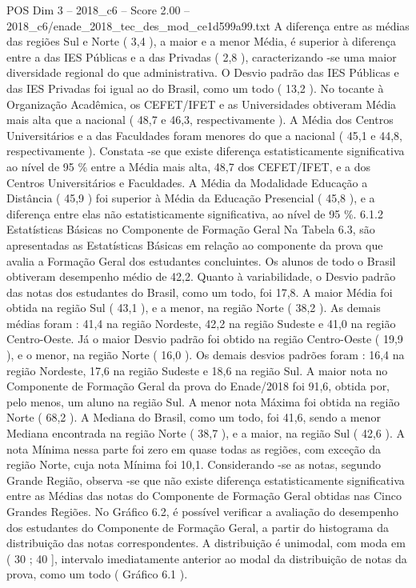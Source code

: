 \begin{textsample}{POS Dim 3 – 2018\_c6 – Score 2.00 – 2018\_c6/enade\_2018\_tec\_des\_mod\_ce1d599a99.txt}
A diferença entre as médias das regiões Sul e Norte ( 3,4 ), a maior e a menor Média, é superior à diferença entre a das IES Públicas e a das Privadas ( 2,8 ), caracterizando -se uma maior diversidade regional do que administrativa.
O Desvio padrão das IES Públicas e das IES Privadas foi igual ao do Brasil, como um todo ( 13,2 ).
No tocante à Organização Acadêmica, os CEFET/IFET e as Universidades obtiveram Média mais alta que a nacional ( 48,7 e 46,3, respectivamente ).
A Média dos Centros Universitários e a das Faculdades foram menores do que a nacional ( 45,1 e 44,8, respectivamente ).
Constata -se que existe diferença estatisticamente significativa ao nível de 95 \% entre a Média mais alta, 48,7 dos CEFET/IFET, e a dos Centros Universitários e Faculdades.
A Média da Modalidade Educação a Distância ( 45,9 ) foi superior à Média da Educação Presencial ( 45,8 ), e a diferença entre elas não estatisticamente significativa, ao nível de 95 \%. 6.1.2 Estatísticas Básicas no Componente de Formação Geral Na Tabela 6.3, são apresentadas as Estatísticas Básicas em relação ao componente da prova que avalia a Formação Geral dos estudantes concluintes.
Os alunos de todo o Brasil obtiveram desempenho médio de 42,2.
Quanto à variabilidade, o Desvio padrão das notas dos estudantes do Brasil, como um todo, foi 17,8.
A maior Média foi obtida na região Sul ( 43,1 ), e a menor, na região Norte ( 38,2 ).
As demais médias foram : 41,4 na região Nordeste, 42,2 na região Sudeste e 41,0 na região Centro-Oeste.
Já o maior Desvio padrão foi obtido na região Centro-Oeste ( 19,9 ), e o menor, na região Norte ( 16,0 ).
Os demais desvios padrões foram : 16,4 na região Nordeste, 17,6 na região Sudeste e 18,6 na região Sul.
A maior nota no Componente de Formação Geral da prova do Enade/2018 foi 91,6, obtida por, pelo menos, um aluno na região Sul.
A menor nota Máxima foi obtida na região Norte ( 68,2 ).
A Mediana do Brasil, como um todo, foi 41,6, sendo a menor Mediana encontrada na região Norte ( 38,7 ), e a maior, na região Sul ( 42,6 ).
A nota Mínima nessa parte foi zero em quase todas as regiões, com exceção da região Norte, cuja nota Mínima foi 10,1.
Considerando -se as notas, segundo Grande Região, observa -se que não existe diferença estatisticamente significativa entre as Médias das notas do Componente de Formação Geral obtidas nas Cinco Grandes Regiões.
No Gráfico 6.2, é possível verificar a avaliação do desempenho dos estudantes do Componente de Formação Geral, a partir do histograma da distribuição das notas correspondentes.
A distribuição é unimodal, com moda em ( 30 ; 40 ], intervalo imediatamente anterior ao modal da distribuição de notas da prova, como um todo ( Gráfico 6.1 ).

\end{textsample}
